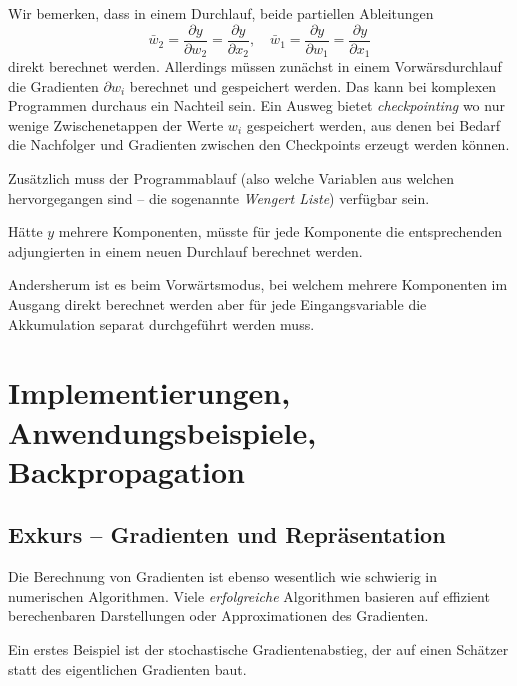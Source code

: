\documentclass[
]{book}
\theoremstyle{definition}
\theoremstyle{definition}
\theoremstyle{definition}
\theoremstyle{definition}
\theoremstyle{remark}
\begin{document}
Wir bemerken, dass in einem Durchlauf, beide partiellen Ableitungen
\begin{equation*}
\bar w_2 = \frac{\partial y}{\partial w_2}= \frac{\partial y}{\partial x_2},\quad \bar w_1 = \frac{\partial y}{\partial w_1}= \frac{\partial y}{\partial x_1}
\end{equation*}
direkt
berechnet werden. Allerdings müssen zunächst in einem
Vorwärsdurchlauf die Gradienten \(\partial w_i\) berechnet und gespeichert werden.
Das kann bei komplexen Programmen durchaus ein Nachteil sein. Ein Ausweg bietet
\emph{checkpointing} wo nur wenige Zwischenetappen der Werte \(w_i\) gespeichert
werden, aus denen bei Bedarf die Nachfolger und Gradienten zwischen den
Checkpoints erzeugt werden können.

Zusätzlich muss der Programmablauf (also welche Variablen aus welchen
hervorgegangen sind -- die sogenannte \emph{Wengert Liste}) verfügbar sein.

Hätte \(y\) mehrere Komponenten, müsste
für jede Komponente die entsprechenden adjungierten in einem neuen
Durchlauf berechnet werden.

Andersherum ist es beim Vorwärtsmodus, bei welchem mehrere Komponenten im
Ausgang direkt berechnet werden aber für jede Eingangsvariable die
Akkumulation separat durchgeführt werden muss.

\hypertarget{implementierungen-anwendungsbeispiele-backpropagation}{%
\chapter{Implementierungen, Anwendungsbeispiele, Backpropagation}\label{implementierungen-anwendungsbeispiele-backpropagation}}

\hypertarget{exkurs-gradienten-und-repruxe4sentation}{%
\section{Exkurs -- Gradienten und Repräsentation}\label{exkurs-gradienten-und-repruxe4sentation}}

Die Berechnung von Gradienten ist ebenso wesentlich wie schwierig in numerischen
Algorithmen.
Viele \emph{erfolgreiche} Algorithmen basieren auf effizient berechenbaren
Darstellungen oder Approximationen des Gradienten.

Ein erstes Beispiel ist der stochastische Gradientenabstieg, der auf einen
Schätzer statt des eigentlichen Gradienten baut.
\end{document}
